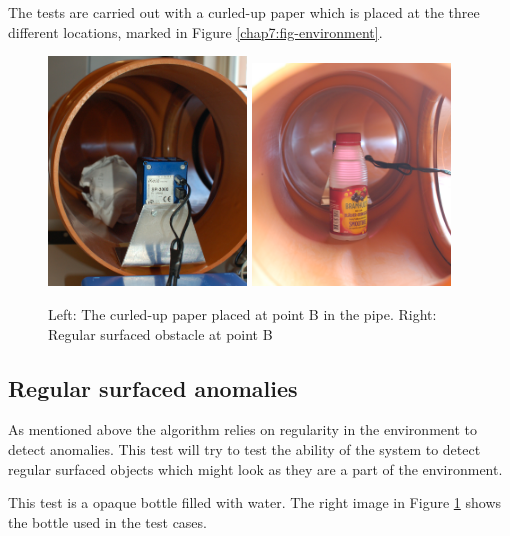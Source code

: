 The tests are carried out with a curled-up paper which is placed at the three different
locations, marked in Figure \ref{chap7:fig-environment}. 
\begin{figure}[htbp]
    \centering
    \includegraphics[width=0.47\textwidth]{pics/irregularSR}
    \includegraphics[width=0.47\textwidth]{pics/pos2-regular-tof}
    \caption{Left: The curled-up paper placed at point B in the pipe. Right: Regular
    surfaced obstacle at point B}
    \label{chap7:fig-pics-of-obstacles}
\end{figure}

\subsection{Regular surfaced anomalies}
As mentioned above the algorithm relies on regularity in the environment to detect
anomalies. This test will try to test the ability of the system to detect regular surfaced
objects which might look as they are a part of the environment. 

This test is a opaque bottle filled with water. The right image in Figure
\ref{chap7:fig-pics-of-obstacles} shows the bottle used in the test cases.

